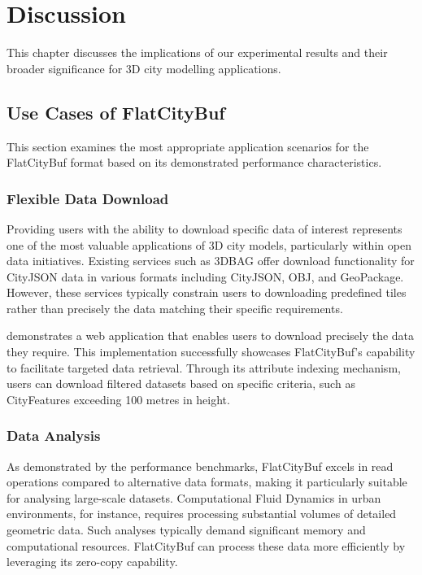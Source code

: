\chapter{Discussion}
\label{chp:discussion}

This chapter discusses the implications of our experimental results and their broader significance for 3D city modelling applications.

\section{Use Cases of FlatCityBuf}
\label{use_case_flat_city_buffer}

This section examines the most appropriate application scenarios for the FlatCityBuf format based on its demonstrated performance characteristics.

\subsection{Flexible Data Download}
\label{flexible_data_download}

Providing users with the ability to download specific data of interest represents one of the most valuable applications of 3D city models, particularly within open data initiatives. Existing services such as 3DBAG offer download functionality for CityJSON data in various formats including CityJSON, OBJ, and GeoPackage. However, these services typically constrain users to downloading predefined tiles rather than precisely the data matching their specific requirements.

\citet{fcb-web-demo} demonstrates a web application that enables users to download precisely the data they require. This implementation successfully showcases FlatCityBuf's capability to facilitate targeted data retrieval. Through its attribute indexing mechanism, users can download filtered datasets based on specific criteria, such as CityFeatures exceeding 100 metres in height.

\subsection{Data Analysis}
\label{data_analysis}

As demonstrated by the performance benchmarks, FlatCityBuf excels in read operations compared to alternative data formats, making it particularly suitable for analysing large-scale datasets. Computational Fluid Dynamics in urban environments, for instance, requires processing substantial volumes of detailed geometric data. Such analyses typically demand significant memory and computational resources. FlatCityBuf can process these data more efficiently by leveraging its zero-copy capability.

